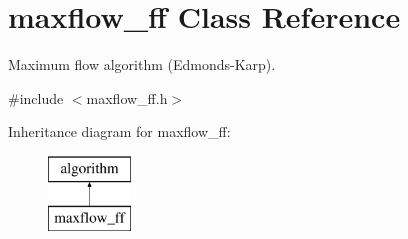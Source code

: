 \hypertarget{classmaxflow__ff}{}\section{maxflow\+\_\+ff Class Reference}
\label{classmaxflow__ff}


Maximum flow algorithm (Edmonds-\/\+Karp).  




{\ttfamily \#include $<$maxflow\+\_\+ff.\+h$>$}

Inheritance diagram for maxflow\+\_\+ff\+:\begin{figure}[H]
\begin{center}
\leavevmode
\includegraphics[height=2.000000cm]{classmaxflow__ff}
\end{center}
\end{figure}
